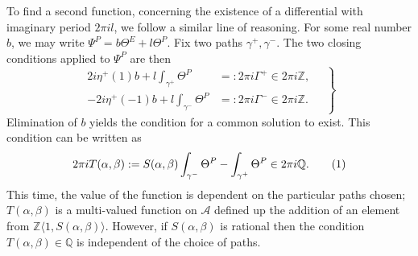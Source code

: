 \documentclass{article}
\numberwithin{equation}{section}
\numberwithin{figure}{section}
\newcommand{\labelthis}[1]{\addtocounter{equation}{1}\tag{\theequation}\label{#1}}
\newcommand{\iu}{i}
\newcommand{\Z}{\mathbb{Z}}
\newcommand{\Q}{\mathbb{Q}}
\begin{document}
To find a second function, concerning the existence of a differential with imaginary period $2\pi\iu l$, we follow a similar line of reasoning. For some real number $b$, we may write $\Psi^P = b \Theta^E + l \Theta^P$. Fix two paths $\gamma^+, \gamma^-$. The two closing conditions applied to $\Psi^P$ are then
\begin{equation}
\left.
\begin{aligned}
2\iu \eta^+(1) b + l\int_{\gamma^+} \Theta^P &=: 2\pi\iu \Gamma^+ \in 2\pi\iu \Z, \\
-2\iu \eta^+(-1) b + l\int_{\gamma^-} \Theta^P &=: 2\pi\iu \Gamma^- \in 2\pi\iu \Z.
\end{aligned}
\quad
\right\}
\label{eqn:period closing cond}
\end{equation}
Elimination of $b$ yields the condition for a common solution to exist. This condition can be written as
\[
2\pi\iu T(\alpha,\beta) := S(\alpha,\beta) \int_{\gamma^-} \Theta^P - \int_{\gamma^+} \Theta^P
\in 2\pi\iu \Q.
\labelthis{eqn:def_T}
\]
This time, the value of the function is dependent on the particular paths chosen; 
$T(\alpha,\beta)$ is a multi-valued function on $\mathcal{A}$ defined up the addition of an element from $\Z\langle 1,S(\alpha,\beta)\rangle$.
However, if $S(\alpha,\beta)$ is rational then the condition $T(\alpha,\beta)\in\Q$ is independent of the choice of paths.
\end{document}
